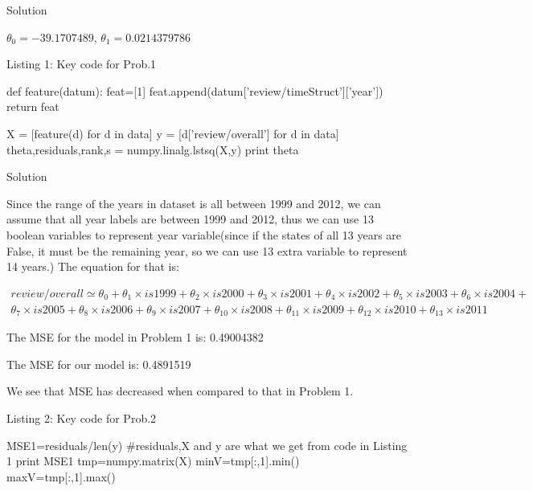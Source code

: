 \documentclass{assignment}
\date{January 22, 2017}
\begin{document}
\begin{problemlist}




\pbitem Solution

$\theta_0=-39.1707489$, $\theta_1= 0.0214379786$

\vspace{2ex}
\begin{center} 
Listing 1: Key code for Prob.1
\end{center}
\begin{python}
def feature(datum):
    feat=[1]
    feat.append(datum['review/timeStruct']['year'])
    return feat

X = [feature(d) for d in data]
y = [d['review/overall'] for d in data]
theta,residuals,rank,s = numpy.linalg.lstsq(X,y)
print theta
\end{python}

\vspace{3ex}

\pbitem Solution

Since the range of the years in dataset is all between 1999 and 2012, we can assume that all year labels are between 1999 and 2012, thus we can use 13 boolean variables to represent year variable(since if the states of all 13 years are False, it must be the remaining year, so we can use 13 extra variable to represent 14 years.) The equation for that is:

\begin{align*}
review/overall\simeq\theta_0+\theta_1\times is1999+\theta_2\times is2000+\theta_3\times is2001+\theta_4\times is2002+\theta_5\times is2003+\theta_6\times is2004+\\
\theta_7\times is2005+\theta_8\times is2006+\theta_9\times is2007+\theta_{10}\times is2008+\theta_{11}\times is2009+\theta_{12}\times is2010+\theta_{13}\times is2011
\end{align*}

The MSE for the model in Problem 1 is: 0.49004382

The MSE for our model is: 0.4891519

We see that MSE has decreased when compared to that in Problem 1.

\begin{center} 
Listing 2: Key code for Prob.2
\end{center}
\begin{python}
MSE1=residuals/len(y)  #residuals,X and y are what we get from code in Listing 1
print MSE1
tmp=numpy.matrix(X)     
minV=tmp[:,1].min()
maxV=tmp[:,1].max()


\end{python}
\end{problemlist}
\end{document}
